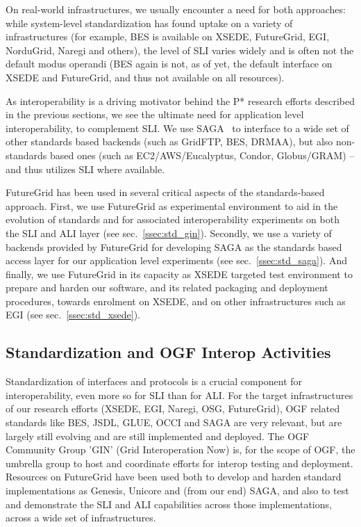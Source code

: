 \documentclass[]{paper}
\begin{document}
On real-world infrastructures, we usually encounter a need for both
approaches: while system-level standardization has found
uptake on %
a variety of
infrastructures (for example, BES is available on XSEDE, FutureGrid,
EGI, NorduGrid, Naregi and others), the level of SLI varies widely and
is often not the default modus operandi (BES again is not, as of yet,
the default interface on XSEDE and FutureGrid, and thus not available
on all resources).

As interoperability is a driving motivator behind the P* research
efforts described in the previous sections, we see the ultimate need
for application level interoperability, to complement SLI.  %
We use SAGA~\cite{ogf-gfd-90} to interface to a wide set of other
standards based backends (such as GridFTP, BES, DRMAA), but also
non-standards based ones (such as EC2/AWS/Eucalyptus, Condor,
Globus/GRAM) -- and thus utilizes SLI where available.

FutureGrid has been used in several critical aspects of the
standards-based approach.
First, we use FutureGrid as experimental environment to aid in the
evolution of standards 
and for associated interoperability experiments on both the SLI and
ALI layer (see sec.~\ref{ssec:std_gin}).  Secondly, we use a variety
of backends provided by FutureGrid for developing SAGA as the
standards based access layer for our application level experiments (see
sec.~\ref{ssec:std_saga}).  And finally, we use FutureGrid in its
capacity as XSEDE targeted test environment to prepare and harden our
software, and its related packaging and deployment procedures, towards
enrolment on XSEDE, and on other infrastructures such as EGI (see
sec.~\ref{ssec:std_xsede}).

\subsection*{Standardization and OGF Interop Activities}
\label{ssec:std_gin}

 Standardization of interfaces and protocols is a crucial component
 for interoperability, even more so for SLI than for ALI.  For the
 target infrastructures of our research efforts (XSEDE, EGI, Naregi,
 OSG, FutureGrid), OGF related standards like BES, JSDL, GLUE, OCCI
 and SAGA are very relevant, but are largely still evolving and are
 still implemented and deployed.  The OGF Community Group 'GIN' (Grid
 Interoperation Now) is, for the scope of OGF, the umbrella group to
 host and coordinate efforts for interop testing and deployment.
 Resources on FutureGrid have been used both to develop and harden
 standard implementations as Genesis, Unicore and (from our end) SAGA,
 and also to test and demonstrate the SLI and ALI capabilities across
 those implementations, across a wide set of infrastructures.
\end{document}
